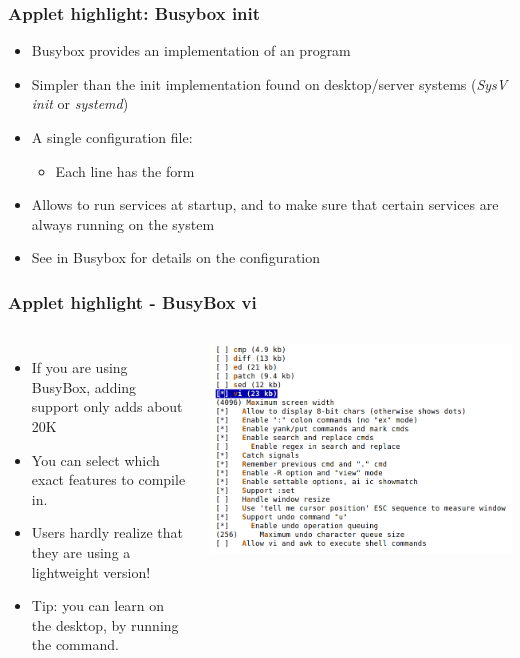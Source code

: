 \begin{frame}
  \frametitle{Applet highlight: Busybox init}
  \begin{itemize}
  \item Busybox provides an implementation of an  program
  \item Simpler than the init implementation found on desktop/server
    systems ({\em SysV init} or {\em systemd})
  \item A single configuration file: 
    \begin{itemize}
    \item Each line has the form 
    \end{itemize}
  \item Allows to run services at startup, and to make sure that
    certain services are always running on the system
  \item See  in Busybox for details on the
    configuration
  \end{itemize}
\end{frame}

\begin{frame}
  \frametitle{Applet highlight - BusyBox vi}
  \begin{columns}
      \begin{itemize}
      \item If you are using BusyBox, adding  support only adds
        about 20K
      \item You can select which exact features to compile in.
      \item Users hardly realize that they are using a lightweight 
        version!
      \item Tip: you can learn  on the desktop, by running the 
        command.
      \end{itemize}
      \includegraphics[width=\textwidth]{slides/sysdev-busybox/busybox-vi-configuration.png}
  \end{columns}
\end{frame}

